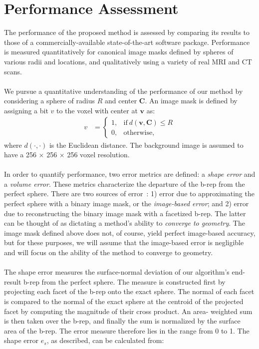\section{Performance Assessment}
%

The performance of the proposed method is assessed by comparing its results to those of a commercially-available state-of-the-art software package. Performance is measured quantitatively for canonical image masks defined by spheres of various radii and locations, and qualitatively using a variety of real MRI and CT scans. \\ \\
%
We pursue a quantitative understanding of the performance of our method by considering a sphere of radius $R$ and center $\bm{C}$.  An image mask is defined by assigning a bit $v$ to the voxel with center at $\bm{v}$ as:
\begin{align} 
	v &=  \begin{cases}
		1, & \text{if}\ d \left(\bm{v},\bm{C}\right) \le R \\
		0, & \text{otherwise},
	\end{cases}
\end{align}
where $d(\cdot,\cdot)$ is the Euclidean distance. The background image is assumed to have a 256 $\times$ 256 $\times$ 256 voxel resolution. \\ \\
%
In order to quantify performance, two error metrics are defined: a {\em shape error} and a {\em volume error}. These metrics characterize the departure of the b-rep from the perfect sphere.  There are two sources of error~\cite{young_2008}: 1) error due to approximating the perfect sphere with a binary image mask, or the {\em image-based error}; and 2) error due to reconstructing the binary image mask with a facetized b-rep.  The latter can be thought of as dictating a method's ability to {\em converge to geometry}. The image mask defined above does not, of course, yield perfect image-based accuracy, but for these purposes, we will assume that the image-based error is negligible and will focus on the ability of the method to converge to geometry.\\ \\
%
The shape error measures the surface-normal deviation of our algorithm's end-result b-rep from the perfect sphere. The measure is constructed first by projecting each facet of the b-rep onto the exact sphere. The normal of each facet is compared to the normal of the exact sphere at the centroid of the projected facet by computing the magnitude of their cross product. An area- weighted sum is then taken over the b-rep, and finally the sum is normalized by the surface area of the b-rep.  The error measure therefore lies in the range from 0 to 1. The shape error $e_s$, as described, can be calculated from:
